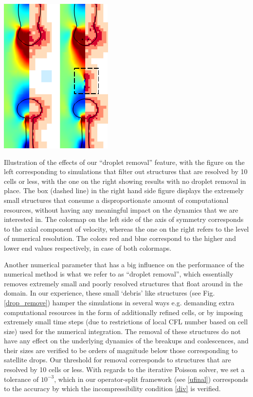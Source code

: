 \begin{marginfigure}[-6cm]
\centering
\includegraphics{plots/ligament_breakup/drop_removal.pdf}
	\caption{Illustration of the effects of our ``droplet removal'' feature, 
	with the figure on the left corresponding to simulations that filter out
	structures that are resolved by 10 cells or less, with the one on the right
	showing results with no droplet removal in place. The box (dashed line) in the 
	right hand side figure displays the extremely small structures that consume 
	a disproportionate amount of computational resources, without having any meaningful
	impact on the dynamics that we are interested in. 
	The colormap on the left side of the axis of 
	symmetry corresponds to the axial component of velocity, whereas the one on the right refers
	to the level of numerical resolution. The colors red and blue correspond to the higher 
	and lower end values respectively, in case of both colormaps. 
	}
\label{drop_remove}
\end{marginfigure}

Another numerical parameter that has a big influence on the performance of 
the numerical method is what we refer to as ``droplet removal'', 
which essentially removes extremely small and poorly 
resolved structures that float around in the domain. 
In our experience, these small `debris' like structures (see Fig. \ref{drop_remove})
hamper the simulations in several ways e.g. demanding extra computational 
resources in the form of additionally refined cells, 
or by imposing extremely small time steps (due to restrictions of 
local CFL number based on cell size) used for the numerical integration. 
The removal of these structures do not have any effect on the 
underlying dynamics of the breakups and coalescences, and their sizes 
are verified to be orders of magnitude below those corresponding to satellite drops. 
Our threshold for removal corresponds to structures that are resolved by 10 cells or less. 
With regards to the iterative Poisson solver, we set a tolerance of $10^{-3}$, which in our
operator-split framework (see \eqref{ufinal}) corresponds to the 
accuracy by which the incompressibility condition \eqref{div} is verified. 

